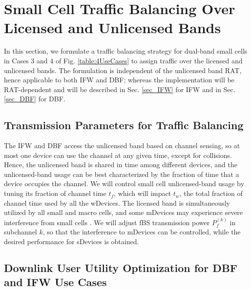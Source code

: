 \documentclass[journal,final,letterpaper,10pt,doublecolumn,twoside]{IEEEtran}
\begin{document}
\section{Small Cell Traffic Balancing Over Licensed and Unlicensed Bands}\label{sec:DL-assignment}

In this section, we formulate a traffic balancing strategy for dual-band small cells in Cases 3 and 4 of Fig. \ref{table:4UseCases} to assign traffic over the licensed and unlicensed bands. The formulation is independent of the unlicensed band RAT, hence applicable to both IFW and DBF; whereas the implementation will be RAT-dependent and will be described in Sec. \ref{sec_IFW} for IFW and in Sec. \ref{sec_DBF} for DBF.

\subsection{Transmission Parameters for Traffic Balancing}\label{subsec:Parameters-To-Optimize}

The IFW and DBF access the unlicensed band based on channel sensing,
so at most one device can use the channel at any given time, except
for collisions. Hence, the unlicensed band is shared in time among
different devices, and the unlicensed-band usage can be best
characterized by the fraction of time that a device occupies the
channel. We will control  small cell unlicensed-band usage by
tuning its fraction of channel time $t_f$, which will impact $t_w$,
the total fraction of channel time used by all the wDevices. The licensed
band is simultaneously utilized by all small and macro cells, and
some mDevices may experience severe interference from small cells
\cite{femto-PowerControl-2010Sundeep}. We will adjust fBS
transmission power $P_f^{(k)}$ in subchannel $k$, so that the
interference to mDevices can be controlled, while the desired
performance for sDevices is obtained.



\subsection{Downlink User Utility Optimization for DBF and IFW Use Cases}\label{sec:user utility opt}
\end{document}
